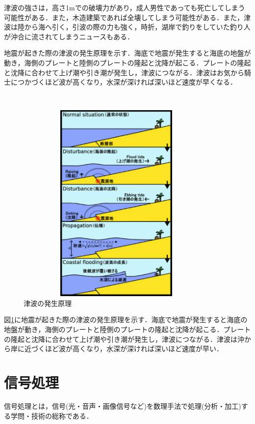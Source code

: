 \documentclass[a4j,11pt]{jsarticle}
\begin{document}
津波の強さは，高さ1mでの破壊力があり，成人男性であっても死亡してしまう可能性がある．また，木造建築であれば全壊してしまう可能性がある．また，津波は陸から海へ引く，引波の際の力も強く，時折，湖岸で釣りをしていた釣り人が沖合に流されてしまうニュースもある．

地震が起きた際の津波の発生原理を示す．海底で地震が発生すると海底の地盤が動き，海側のプレートと陸側のプレートの隆起と沈降が起こる．プレートの隆起と沈降に合わせて上げ潮や引き潮が発生し，津波につながる．津波はお気から騎士につかづくほど波が高くなり，水深が深ければ深いほど速度が早くなる．

\newpage
\begin{figure}[h]
\begin{center}
 \includegraphics[clip,width=100mm,height=100mm]{eathquack.pdf}
\end{center}
 \caption{津波の発生原理\cite{oka2}}
 \label{fig:eathquack}
\end{figure}

図\ref{fig:eathquack}に地震が起きた際の津波の発生原理を示す．海底で地震が発生すると海底の地盤が動き，海側のプレートと陸側のプレートの隆起と沈降が起こる．プレートの隆起と沈降に合わせて上げ潮や引き潮が発生し，津波につながる．津波は沖から岸に近づくほど波が高くなり，水深が深ければ深いほど速度が早い．

\newpage


\section{信号処理}
信号処理とは，信号(光・音声・画像信号など)を数理手法で処理(分析・加工)する学問・技術の総称である．
\end{document}
